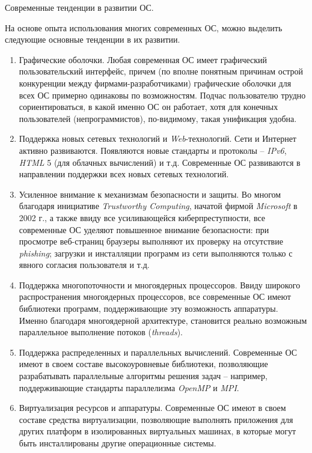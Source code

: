 Современные тенденции в развитии ОС.

На основе опыта использования многих современных ОС, можно выделить следующие основные тенденции в их развитии.
\begin{enumerate}
	
	\item Графические оболочки. Любая современная ОС имеет графический пользовательский интерфейс, причем (по вполне понятным причинам острой конкуренции между фирмами-разработчиками) графические оболочки для всех ОС примерно одинаковы по возможностям. Подчас пользователю трудно сориентироваться, в какой именно ОС он работает, хотя для конечных пользователей (непрограммистов), по-видимому, такая унификация удобна.
	
	\item Поддержка новых сетевых технологий и \textit{Web}-технологий. Сети и Интернет активно развиваются. Появляются новые стандарты и протоколы – \textit{IPv6}, \textit{HTML} 5 (для облачных вычислений) и т.д. Современные ОС развиваются в направлении поддержки всех новых сетевых технологий.
	
	\item Усиленное внимание к механизмам безопасности и защиты. Во многом благодаря инициативе \textit{Trustworthy Computing}, начатой фирмой \textit{Microsoft} в 2002 г., а также ввиду все усиливающейся киберпреступности, все современные ОС уделяют повышенное внимание безопасности: при просмотре веб-страниц браузеры выполняют их проверку на отсутствие \textit{phishing}; загрузки и инсталляции программ из сети выполняются только с явного согласия пользователя и т.д.
	
	\item Поддержка многопоточности и многоядерных процессоров. Ввиду широкого распространения многоядерных процессоров, все современные ОС имеют библиотеки программ, поддерживающие эту возможность аппаратуры. Именно благодаря многоядерной архитектуре, становится реально возможным параллельное выполнение потоков (\textit{threads}).
	
	\item Поддержка распределенных и параллельных вычислений. Современные ОС имеют в своем составе высокоуровневые библиотеки, позволяющие разрабатывать параллельные алгоритмы решения задач – например, поддерживающие стандарты параллелизма \textit{OpenMP} и \textit{MPI}.
	
	\item Виртуализация ресурсов и аппаратуры. Современные ОС имеют в своем составе средства виртуализации, позволяющие выполнять приложения для других платформ в изолированных виртуальных машинах, в которые могут быть инсталлированы другие операционные системы.
	

\end{enumerate}
